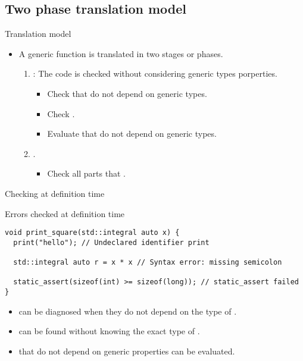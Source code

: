 \subsection{Two phase translation model}

\begin{frame}[t,fragile]{Translation model}
\begin{itemize}
  \item A generic function is translated in two stages or phases.

  \begin{enumerate}

    \item {}:
          The code is checked without considering generic types porperties.
      \begin{itemize}
        \item Check  that do not depend on generic types.
        \item Check .
        \item Evaluate  that do not depend on generic types.
      \end{itemize}
    

    \item {}.
      \begin{itemize}
        \item Check all parts that .
      \end{itemize}

  \end{enumerate}
\end{itemize}
\end{frame}

\begin{frame}[t,fragile]{Checking at definition time}
\begin{block}{Errors checked at definition time}
\begin{lstlisting}
void print_square(std::integral auto x) {
  print("hello"); // Undeclared identifier print

  std::integral auto r = x * x // Syntax error: missing semicolon

  static_assert(sizeof(int) >= sizeof(long)); // static_assert failed
}
\end{lstlisting}
\end{block}

  \begin{itemize}
    \item {} can be diagnosed 
          when they do not depend on the type of .

    \item {} can be found 
          without knowing the exact type of .

    \item {} that do not depend 
          on generic properties can be evaluated.
  \end{itemize}
\end{frame}

